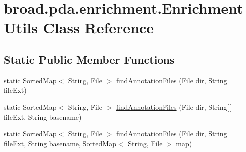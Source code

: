 \hypertarget{classbroad_1_1pda_1_1enrichment_1_1_enrichment_utils}{\section{broad.\+pda.\+enrichment.\+Enrichment\+Utils Class Reference}
\label{classbroad_1_1pda_1_1enrichment_1_1_enrichment_utils}
}
\subsection*{Static Public Member Functions}
\begin{DoxyCompactItemize}
\item 
static Sorted\+Map$<$ String, File $>$ \hyperlink{classbroad_1_1pda_1_1enrichment_1_1_enrichment_utils_a7a3185a97b5cc69d8233c9d80a3210a2}{find\+Annotation\+Files} (File dir, String\mbox{[}$\,$\mbox{]} file\+Ext)
\item 
static Sorted\+Map$<$ String, File $>$ \hyperlink{classbroad_1_1pda_1_1enrichment_1_1_enrichment_utils_a7754dc4fd77dd25f265edacec9950903}{find\+Annotation\+Files} (File dir, String\mbox{[}$\,$\mbox{]} file\+Ext, String basename)
\item 
static Sorted\+Map$<$ String, File $>$ \hyperlink{classbroad_1_1pda_1_1enrichment_1_1_enrichment_utils_a8a2a3cdbf98e93168934a17efc71d459}{find\+Annotation\+Files} (File dir, String\mbox{[}$\,$\mbox{]} file\+Ext, String basename, Sorted\+Map$<$ String, File $>$ map)
\end{DoxyCompactItemize}



